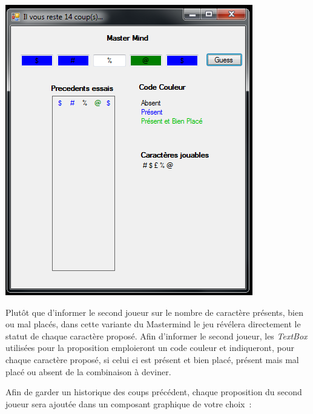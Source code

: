 \documentclass[10pt,a4paper,oneside]{article}
\begin{document}
\begin{center}
    \includegraphics[scale=0.6]{pictures/player2try1answer.png}
\end{center}

Plutôt que d'informer le second joueur sur le nombre de caractère présents, bien ou mal placés, dans cette variante du Mastermind le jeu révélera directement le statut de chaque caractère proposé. Afin d'informer le second joueur, les {\em TextBox} utilisées pour la proposition emploieront un code couleur et indiqueront, pour chaque caractère proposé, si celui ci est présent et bien placé, présent mais mal placé ou absent de la combinaison à deviner. 

\medskip

Afin de garder un historique des coups précédent, chaque proposition du second joueur sera ajoutée dans un composant graphique de votre choix~:
\end{document}
